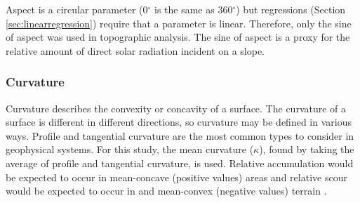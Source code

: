 \documentclass{sfuthesis}
\begin{document}
Aspect is a circular parameter (0${^\circ}$ is the same as 360${^\circ}$) but regressions (Section \ref{sec:linearregression}) require that a parameter is linear. Therefore, only the sine of aspect was used in topographic analysis. The sine of aspect is a proxy for the relative amount of direct solar radiation incident on a slope.


\subsubsection*{Curvature} 

Curvature describes the convexity or concavity of a surface. The curvature of a surface is different in different directions, so curvature may be defined in various ways. Profile and tangential curvature are the most common types to consider in geophysical systems. For this study, the mean curvature ($\kappa$), found by taking the average of profile and tangential curvature, is used. Relative accumulation would be expected to occur in mean-concave (positive values) areas and relative scour would be expected to occur in and mean-convex (negative values) terrain \citep{Olaya2009}.
\end{document}
